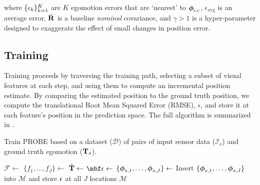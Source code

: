 where $\{\epsilon_k\}_{k=1}^K$ are $K$ egomotion errors that are `nearest' to $\boldsymbol{\mathbf{\phi}}_{i,c}$, $\epsilon_\text{avg}$ is an average error, $\bar{\boldsymbol{\mathbf{R}}}$ is a baseline \textit{nominal} covariance, and $\gamma > 1$ is a hyper-parameter designed to exaggerate the effect of small changes in position error.

\subsection{Training}
Training proceeds by traversing the training path, selecting a subset of visual features at each step, and using them to compute an incremental position estimate. By comparing the estimated position to the ground truth position, we compute the translational Root Mean Squared Error (RMSE), $\epsilon$, and store it at each feature's position in the prediction space. The full algorithm is summarized in . 

\begin{algorithm}
  \caption{Train PROBE based on a dataset ($\mathcal{D}$) of pairs of input sensor data ($\mathcal{I}_s$) and ground truth egomotion ($\boldsymbol{\mathbf{T}}_s$).}
   \label{alg:probe_train}
  \begin{algorithmic}
	\State $\mathcal{F} \gets$ 
	\State $\{f_1, \dots, f_J\} \gets$ 
	\State $\hat{\boldsymbol{\mathbf{T}}} \gets$ 
	\State $\mbf \PROBEPoseError  \gets$ 
	\State $\{\boldsymbol{\mathbf{\phi}}_{s,1}, \dots, \boldsymbol{\mathbf{\phi}}_{s,J}\} \gets$ 
	\State Insert $\{\boldsymbol{\mathbf{\phi}}_{s,1}, \dots,  \boldsymbol{\mathbf{\phi}}_{s,J}\}$ into $\mathcal{M}$ and store $\epsilon$ at all $J$ locations
	\EndFor
      \EndFor
      \State\Return  $\mathcal{M}$
    \EndFunction
  \end{algorithmic}
\end{algorithm}

